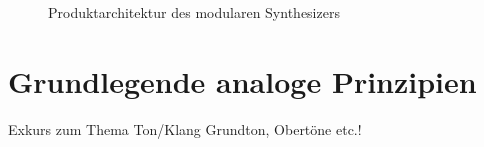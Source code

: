 \begin{figure}[h]
	\centering
	\setlength{\fboxsep}{1pt} %
	\setlength{\fboxrule}{1pt} %
	\caption{Produktarchitektur des modularen Synthesizers}
	\label{fig:fig:Produktarchitektur}
\end{figure}


\newpage
\section{Grundlegende analoge Prinzipien}
\label{sec:AnalogePrinzipien}

Exkurs zum Thema Ton/Klang 
Grundton, Obertöne etc.!




